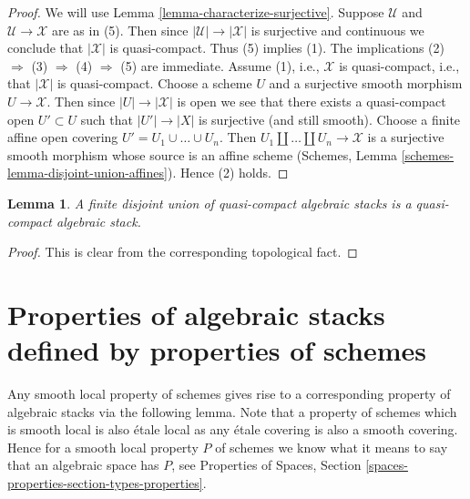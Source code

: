 \documentclass{stacks-project}
\theoremstyle{plain}
\newtheorem{lemma}[subsection]{Lemma}
\theoremstyle{definition}
\theoremstyle{remark}
\numberwithin{equation}{subsection}
\begin{document}
\begin{proof}
We will use
Lemma \ref{lemma-characterize-surjective}.
Suppose $\mathcal{U}$ and $\mathcal{U} \to \mathcal{X}$ are as in (5).
Then since $|\mathcal{U}| \to |\mathcal{X}|$ is surjective and
continuous we conclude that $|\mathcal{X}|$ is quasi-compact.
Thus (5) implies (1). The implications
(2) $\Rightarrow$ (3) $\Rightarrow$ (4) $\Rightarrow$ (5)
are immediate. Assume (1), i.e., $\mathcal{X}$ is quasi-compact, i.e., that
$|\mathcal{X}|$ is quasi-compact. Choose a scheme $U$ and a surjective
smooth morphism $U \to \mathcal{X}$. Then since $|U| \to |\mathcal{X}|$
is open we see that there exists a quasi-compact open $U' \subset U$
such that $|U'| \to |X|$ is surjective (and still smooth).
Choose a finite affine open covering $U' = U_1 \cup \ldots \cup U_n$.
Then $U_1 \amalg \ldots \amalg U_n \to \mathcal{X}$
is a surjective smooth morphism whose source is an
affine scheme (Schemes, Lemma \ref{schemes-lemma-disjoint-union-affines}).
Hence (2) holds.
\end{proof}

\begin{lemma}
\label{lemma-finite-disjoint-quasi-compact}
A finite disjoint union of quasi-compact algebraic stacks is
a quasi-compact algebraic stack.
\end{lemma}

\begin{proof}
This is clear from the corresponding topological fact.
\end{proof}


\section{Properties of algebraic stacks defined by properties of schemes}
\label{section-types-properties}

\noindent
Any smooth local property of schemes gives rise to a corresponding
property of algebraic stacks via the following lemma. Note that a
property of schemes which is smooth local is also \'etale local
as any \'etale covering is also a smooth covering. Hence for a smooth
local property $P$ of schemes we know what it means to say that
an algebraic space has $P$, see
Properties of Spaces, Section \ref{spaces-properties-section-types-properties}.
\end{document}
